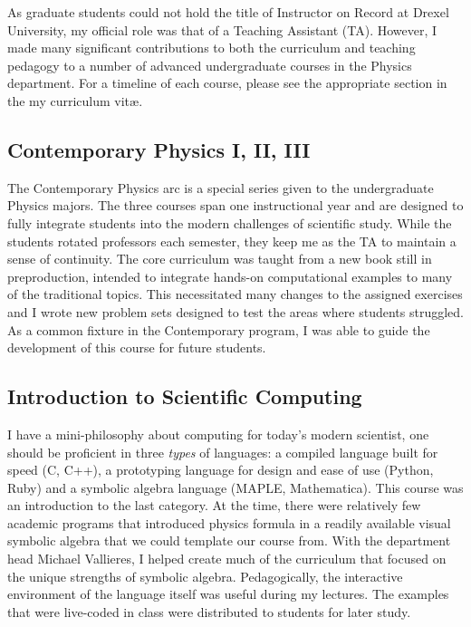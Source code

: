 \documentclass[]{scrartcl}
\begin{document}
\begin{cleanCV}

\drawcvheadertitle{2cm}

\vspace{1em}

As graduate students could not hold the title of Instructor on Record at Drexel University, my official role was that of a Teaching Assistant (TA).
However, I made many significant contributions to both the curriculum and teaching pedagogy to a number of advanced undergraduate courses in the Physics department.
For a timeline of each course, please see the appropriate section in the my curriculum vit\ae.

\subsection{Contemporary Physics I, II, III}

The Contemporary Physics arc is a special series given to the undergraduate Physics majors.
The three courses span one instructional year and are designed to fully integrate students into the modern challenges of scientific study.
While the students rotated professors each semester, they keep me as the TA to maintain a sense of continuity.
The core curriculum was taught from a new book still in preproduction, intended to integrate hands-on computational examples to many of the traditional topics.
This necessitated many changes to the assigned exercises and I wrote new problem sets designed to test the areas where students struggled.
As a common fixture in the Contemporary program, I was able to guide the development of this course for future students.

\subsection{Introduction to Scientific Computing}

I have a mini-philosophy about computing for today's modern scientist, one should be proficient in three \emph{types} of languages: a compiled language built for speed (C, C++), a prototyping language for design and ease of use (Python, Ruby) and a symbolic algebra language (MAPLE, Mathematica).
This course was an introduction to the last category.
At the time, there were relatively few academic programs that introduced physics formula in a readily available visual symbolic algebra that we could template our course from.
With the department head Michael Vallieres, I helped create much of the curriculum that focused on the unique strengths of symbolic algebra.
Pedagogically, the interactive environment of the language itself was useful during my lectures.
The examples that were live-coded in class were distributed to students for later study.



\end{cleanCV}
\end{document}
